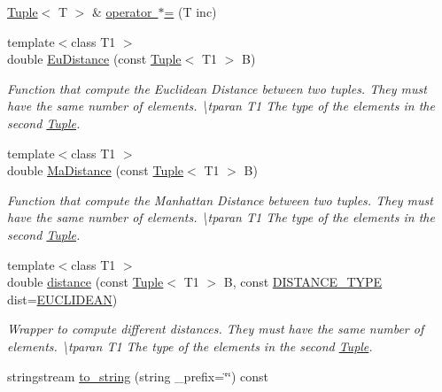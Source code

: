 \begin{DoxyCompactItemize}
\item 
\mbox{\hyperlink{class_tuple}{Tuple}}$<$ T $>$ \& \mbox{\hyperlink{class_tuple_a5dfd14ef6f956b608d6a99bdf0cf9c75}{operator $\ast$=}} (T inc)
\item 
{\footnotesize template$<$class T1 $>$ }\\double \mbox{\hyperlink{class_tuple_a973d6cae203bca0c1ce0d0b65279e433}{Eu\+Distance}} (const \mbox{\hyperlink{class_tuple}{Tuple}}$<$ T1 $>$ B)
\begin{DoxyCompactList}\small\item\em Function that compute the Euclidean Distance between two tuples. They must have the same number of elements. \textbackslash{}tparan T1 The type of the elements in the second \mbox{\hyperlink{class_tuple}{Tuple}}. \end{DoxyCompactList}\item 
{\footnotesize template$<$class T1 $>$ }\\double \mbox{\hyperlink{class_tuple_ac668269743d9be71769c9b4a424c785f}{Ma\+Distance}} (const \mbox{\hyperlink{class_tuple}{Tuple}}$<$ T1 $>$ B)
\begin{DoxyCompactList}\small\item\em Function that compute the Manhattan Distance between two tuples. They must have the same number of elements. \textbackslash{}tparan T1 The type of the elements in the second \mbox{\hyperlink{class_tuple}{Tuple}}. \end{DoxyCompactList}\item 
{\footnotesize template$<$class T1 $>$ }\\double \mbox{\hyperlink{class_tuple_af47521571361439c96392dee70a79cc7}{distance}} (const \mbox{\hyperlink{class_tuple}{Tuple}}$<$ T1 $>$ B, const \mbox{\hyperlink{maths_8hh_ac50d7263b1cae8691420b86282b27f90}{D\+I\+S\+T\+A\+N\+C\+E\+\_\+\+T\+Y\+PE}} dist=\mbox{\hyperlink{maths_8hh_ac50d7263b1cae8691420b86282b27f90a81bbbc4428c3ff3f1327e94957e2b5f1}{E\+U\+C\+L\+I\+D\+E\+AN}})
\begin{DoxyCompactList}\small\item\em Wrapper to compute different distances. They must have the same number of elements. \textbackslash{}tparan T1 The type of the elements in the second \mbox{\hyperlink{class_tuple}{Tuple}}. \end{DoxyCompactList}\item 
stringstream \mbox{\hyperlink{class_tuple_a029b06891c82353ae40c13199830e90a}{to\+\_\+string}} (string \+\_\+prefix=\char`\"{}\char`\"{}) const
\item 

\end{DoxyCompactItemize}
